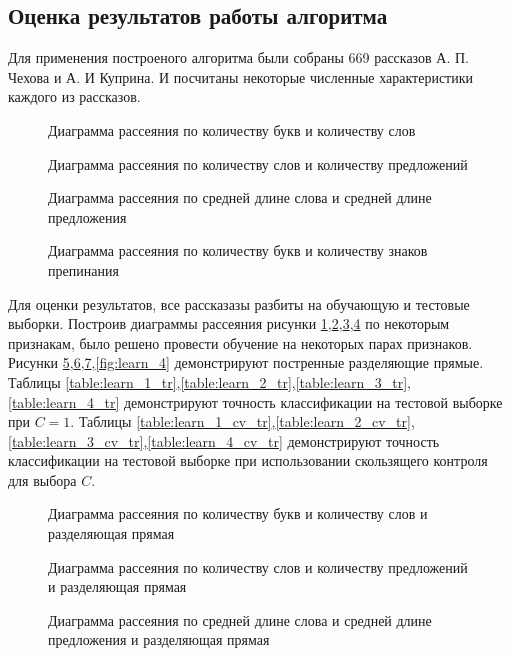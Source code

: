 \documentclass[%
bachelor,    %
subf,        %
href,        %
colorlinks,  %
]{disser}
\begin{document}
\subsection{Оценка результатов работы алгоритма}
Для применения построеного алгоритма были собраны 669 рассказов А. П. Чехова и А. И Куприна. И посчитаны некоторые численные характеристики каждого из рассказов.
\begin{figure}
	\centering		
	
	\caption{Диаграмма рассеяния по количеству букв и количеству слов}
	\label{fig:scatter_1}
\end{figure}
\begin{figure}
	\centering		
	
	\caption{Диаграмма рассеяния по количеству слов и количеству предложений}
	\label{fig:scatter_2}
\end{figure}
\begin{figure}
	\centering		
	
	\caption{Диаграмма рассеяния по средней длине слова и средней длине предложения }
	\label{fig:scatter_3}
\end{figure}

\begin{figure}
	\centering		
	
	\caption{Диаграмма рассеяния по количеству букв и количеству знаков препинания }
	\label{fig:scatter_4}
\end{figure}
Для оценки результатов, все рассказазы разбиты на обучающую и тестовые выборки.
Построив диаграммы рассеяния рисунки \ref{fig:scatter_1},\ref{fig:scatter_2},\ref{fig:scatter_3},\ref{fig:scatter_4} по некоторым признакам, было решено провести обучение на некоторых парах признаков.
Рисунки \ref{fig:learn_1},\ref{fig:learn_2},\ref{fig:learn_3},\ref{fig:learn_4} демонстрируют постренные разделяющие прямые. 
Таблицы \ref{table:learn_1_tr},\ref{table:learn_2_tr},\ref{table:learn_3_tr},\ref{table:learn_4_tr} демонстрируют точность классификации на тестовой выборке при $C=1$.
Таблицы \ref{table:learn_1_cv_tr},\ref{table:learn_2_cv_tr},\ref{table:learn_3_cv_tr},\ref{table:learn_4_cv_tr} демонстрируют точность классификации на тестовой выборке при использовании скользящего контроля для выбора $C$.
\begin{figure}
	\centering		
	
	\caption{Диаграмма рассеяния по количеству букв и количеству слов и разделяющая прямая}
	\label{fig:learn_1}
\end{figure}
\begin{figure}
	\centering		
	
	\caption{Диаграмма рассеяния по количеству слов и количеству предложений и разделяющая прямая}
	\label{fig:learn_2}
\end{figure}
\begin{figure}
	\centering		
	
	\caption{Диаграмма рассеяния по средней длине слова и средней длине предложения и разделяющая прямая}
	\label{fig:learn_3}
\end{figure}
\end{document}
